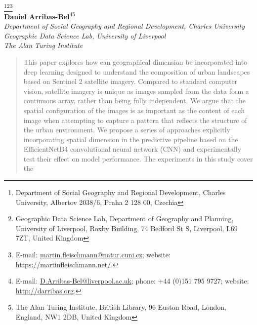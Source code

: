 \documentclass[pdftex,letterpaper,11pt]{article}%
\begin{document}
\begin{titlepage}
\vspace*{1ex}
\begin{minipage}{\textwidth}
\begin{center}%

    {}\\[4ex]%

{\Large{}\footnote[1]{Department of Social Geography and Regional Development, Charles University, Albertov 2038/6, Praha 2 128 00, Czechia}\footnote[2]{Geographic
Data Science Lab, Department of Geography and Planning, University of
Liverpool, Roxby Building, 74 Bedford St S, Liverpool, L69 7ZT, United
Kingdom}\footnote[4]{
E-mail: \url{martin.fleischmann@natur.cuni.cz}; website: \url{https://martinfleischmann.net/}.}}\\[1mm]
%
{\Large\textbf{Daniel Arribas-Bel}\footnotemark[2]\footnote[3]{E-mail: \url{D.Arribas-Bel@liverpool.ac.uk}; phone: +44 (0)151 795 9727; website: \url{http://darribas.org}.
}}\footnote[5]{The Alan Turing Institute, British Library, 96 Euston Road, London, England, NW1 2DB, United Kingdom}
\\[1mm]
{\large\textit{Department of Social Geography and Regional Development, Charles University} }\\
{\large\textit{Geographic Data Science Lab, University of Liverpool} }\\
{\large\textit{The Alan Turing Institute} }\\[2.5ex]
%
\date{\today}\vspace{1.5ex}
%
\end{center}
%
\begin{abstract}
    This paper explores how can geographical dimension be incorporated into deep
    learning designed to understand the composition of urban landscapes based on
    Sentinel 2 satellite imagery. Compared to standard computer vision, satellite
    imagery is unique as images sampled from the data form a continuous array, rather
    than being fully independent. We argue that the spatial configuration of the images
    is as important as the content of each image when attempting to capture a pattern
    that reflects the structure of the urban environment. We propose a series of
    approaches explicitly incorporating spatial dimension in the predictive pipeline
    based on the EfficientNetB4 convolutional neural network (CNN) and experimentally
    test their effect on model performance. The experiments in this study cover the

\end{abstract}
\end{minipage}
\end{titlepage}
\end{document}

